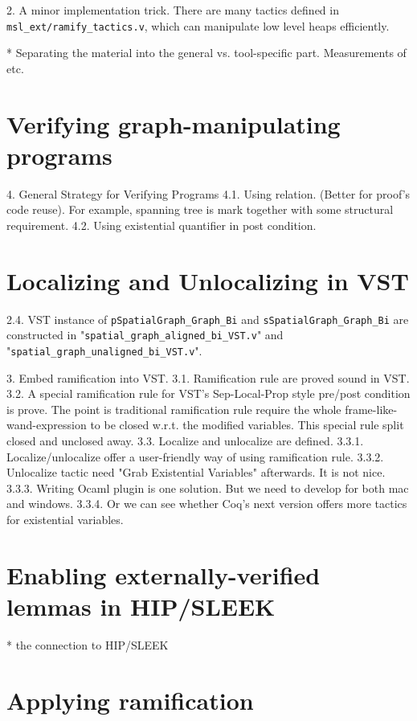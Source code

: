 \documentclass[pldi]{sigplanconf-pldi15}
\begin{document}
2. A minor implementation trick. There are many tactics defined in \texttt{msl\_ext/ramify\_tactics.v}, which can manipulate low level heaps efficiently.

* Separating the material into the general vs. tool-specific part.  Measurements of etc.

\section{Verifying graph-manipulating programs}

4. General Strategy for Verifying Programs
4.1. Using relation. (Better for proof's code reuse). For example, spanning tree is mark together with some structural requirement.
4.2. Using existential quantifier in post condition.

\section{Localizing and Unlocalizing in VST}

2.4. VST instance of \texttt{pSpatialGraph\_Graph\_Bi} and \texttt{sSpatialGraph\_Graph\_Bi} are constructed in "\texttt{spatial\_graph\_aligned\_bi\_VST.v}" and "\texttt{spatial\_graph\_unaligned\_bi\_VST.v}".

3. Embed ramification into VST.
3.1. Ramification rule are proved sound in VST.
3.2. A special ramification rule for VST's Sep-Local-Prop style pre/post condition is prove. The point is traditional ramification rule require the whole frame-like-wand-expression to be closed w.r.t. the modified variables. This special rule split closed and unclosed away.
3.3. Localize and unlocalize are defined.
3.3.1. Localize/unlocalize offer a user-friendly way of using ramification rule.
3.3.2. Unlocalize tactic need "Grab Existential Variables" afterwards. It is not nice.
3.3.3. Writing Ocaml plugin is one solution. But we need to develop for both mac and windows.
3.3.4. Or we can see whether Coq's next version offers more tactics for existential variables.

\section{Enabling externally-verified lemmas in HIP/SLEEK}

* the connection to HIP/SLEEK

\section{Applying ramification}
\end{document}
